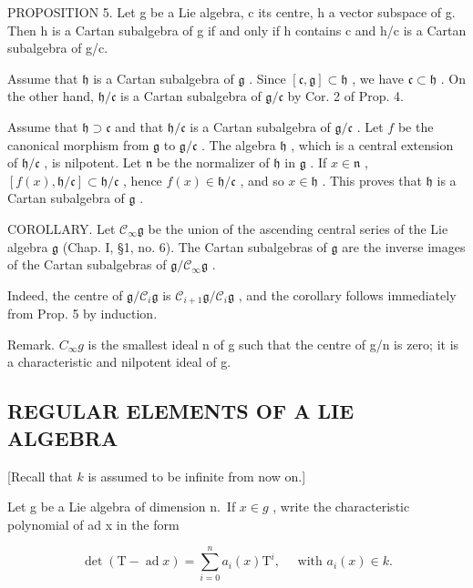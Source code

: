PROPOSITION 5. Let g be a Lie algebra, c its centre, h a vector subspace of g. Then h is a Cartan subalgebra of g if and only if h contains c and h/c is a Cartan subalgebra of g/c.

Assume that \(\mathfrak{h}\) is a Cartan subalgebra of \(\mathfrak{g}\) . Since \([\mathfrak{c},\mathfrak{g}]\subset \mathfrak{h}\) , we have \(\mathfrak{c}\subset \mathfrak{h}\) . On the other hand, \(\mathfrak{h} / \mathfrak{c}\) is a Cartan subalgebra of \(\mathfrak{g} / \mathfrak{c}\) by Cor. 2 of Prop. 4.

Assume that \(\mathfrak{h} \supset \mathfrak{c}\) and that \(\mathfrak{h} / \mathfrak{c}\) is a Cartan subalgebra of \(\mathfrak{g} / \mathfrak{c}\) . Let \(f\) be the canonical morphism from \(\mathfrak{g}\) to \(\mathfrak{g} / \mathfrak{c}\) . The algebra \(\mathfrak{h}\) , which is a central extension of \(\mathfrak{h} / \mathfrak{c}\) , is nilpotent. Let \(\mathfrak{n}\) be the normalizer of \(\mathfrak{h}\) in \(\mathfrak{g}\) . If \(x \in \mathfrak{n}\) , \([f(x), \mathfrak{h} / \mathfrak{c}] \subset \mathfrak{h} / \mathfrak{c}\) , hence \(f(x) \in \mathfrak{h} / \mathfrak{c}\) , and so \(x \in \mathfrak{h}\) . This proves that \(\mathfrak{h}\) is a Cartan subalgebra of \(\mathfrak{g}\) .

COROLLARY. Let \(\mathcal{C}_{\infty}\mathfrak{g}\) be the union of the ascending central series of the Lie algebra \(\mathfrak{g}\) (Chap. I, §1, no. 6). The Cartan subalgebras of \(\mathfrak{g}\) are the inverse images of the Cartan subalgebras of \(\mathfrak{g}/\mathcal{C}_{\infty}\mathfrak{g}\) .

Indeed, the centre of \(\mathfrak{g} / \mathcal{C}_i\mathfrak{g}\) is \(\mathcal{C}_{i + 1}\mathfrak{g} / \mathcal{C}_i\mathfrak{g}\) , and the corollary follows immediately from Prop. 5 by induction.

Remark. \(C_{\infty}g\) is the smallest ideal n of g such that the centre of g/n is zero; it is a characteristic and nilpotent ideal of g.

\subsection{REGULAR ELEMENTS OF A LIE ALGEBRA}

{[}Recall that \(k\) is assumed to be infinite from now on.{]}

Let g be a Lie algebra of dimension n.~If \(x \in g\) , write the characteristic polynomial of ad x in the form

\[
\det (\mathrm{T} - \operatorname{ad} x) = \sum_ {i = 0} ^ {n} a _ {i} (x) \mathrm{T} ^ {i}, \quad \text { with } a _ {i} (x) \in k.
\]

